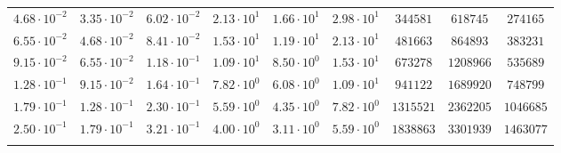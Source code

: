 \documentclass[draft,linenumbers]{agujournal2018}
\begin{document}
\begin{table}
\begin{tabular}{c c c c c c c c c}
$4.68\cdot 10^{-2}$ & $3.35\cdot 10^{-2}$ & $6.02\cdot 10^{-2}$ & $2.13\cdot 10^{1}$ & $1.66\cdot 10^{1}$ & $2.98\cdot 10^{1}$ & $    344581$ & $    618745$ & $ 274165$\\
$6.55\cdot 10^{-2}$ & $4.68\cdot 10^{-2}$ & $8.41\cdot 10^{-2}$ & $1.53\cdot 10^{1}$ & $1.19\cdot 10^{1}$ & $2.13\cdot 10^{1}$ & $    481663$ & $    864893$ & $ 383231$\\
$9.15\cdot 10^{-2}$ & $6.55\cdot 10^{-2}$ & $1.18\cdot 10^{-1}$ & $1.09\cdot 10^{1}$ & $8.50\cdot 10^{0}$ & $1.53\cdot 10^{1}$ & $    673278$ & $   1208966$ & $ 535689$\\
$1.28\cdot 10^{-1}$ & $9.15\cdot 10^{-2}$ & $1.64\cdot 10^{-1}$ & $7.82\cdot 10^{0}$ & $6.08\cdot 10^{0}$ & $1.09\cdot 10^{1}$ & $    941122$ & $   1689920$ & $ 748799$\\
$1.79\cdot 10^{-1}$ & $1.28\cdot 10^{-1}$ & $2.30\cdot 10^{-1}$ & $5.59\cdot 10^{0}$ & $4.35\cdot 10^{0}$ & $7.82\cdot 10^{0}$ & $   1315521$ & $   2362205$ & $1046685$\\
$2.50\cdot 10^{-1}$ & $1.79\cdot 10^{-1}$ & $3.21\cdot 10^{-1}$ & $4.00\cdot 10^{0}$ & $3.11\cdot 10^{0}$ & $5.59\cdot 10^{0}$ & $   1838863$ & $   3301939$ & $1463077$\\
\hline \\
\end{tabular}
\label{table:evalfreqs119d}
\end{table}

\clearpage


\end{document}
